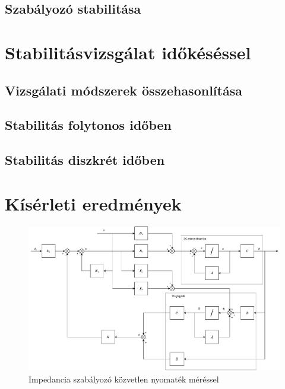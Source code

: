 \section{Szabályozó stabilitása}

\chapter{Stabilitásvizsgálat időkéséssel}\label{chap:time_delay_stability}

\section{Vizsgálati módszerek összehasonlítása}

\section{Stabilitás folytonos időben}

\section{Stabilitás diszkrét időben}

\chapter{Kísérleti eredmények}\label{chap:experimental_results}

\begin{figure}[ht]
\begin{center}
\includegraphics[width=\textwidth]{images/compensated_position_control_torque.drawio.pdf}
\caption{Impedancia szabályozó közvetlen nyomaték méréssel}
\end{center}
\end{figure}

